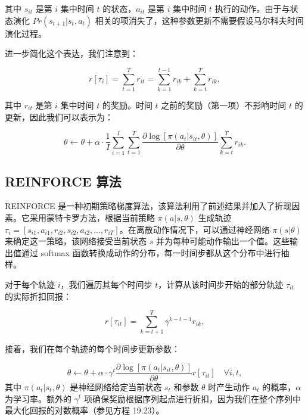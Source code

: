 其中 \(s_{it}\) 是第 \(i\) 集中时间 \(t\) 的状态，\(a_{it}\) 是第 \(i\) 集中时间 \(t\) 执行的动作。由于与状态演化 \(Pr(s_{t+1}|s_t, a_t)\) 相关的项消失了，这种参数更新不需要假设马尔科夫时间演化过程。

进一步简化这个表达，我们注意到：

\begin{equation}
r[\tau_i] = \sum_{t=1}^{T} r_{it} = \sum_{k=1}^{t-1} r_{ik} + \sum_{k=t}^{T} r_{ik}, 
\end{equation}

其中 \(r_{it}\) 是第 \(i\) 集中时间 \(t\) 的奖励。时间 \(t\) 之前的奖励（第一项）不影响时间 \(t\) 的更新，因此我们可以表示为：

\begin{equation}
\theta \leftarrow \theta + \alpha \cdot \frac{1}{I} \sum_{i=1}^{I} \sum_{t=1}^{T} \frac{\partial \log [\pi(a_t|s_{it}, \theta)]}{\partial \theta} \sum_{k=t}^{T} r_{ik}. 
\end{equation}

\subsection{REINFORCE 算法}
REINFORCE 是一种初期策略梯度算法，该算法利用了前述结果并加入了折现因素。它采用蒙特卡罗方法，根据当前策略 \(\pi(a|s, \theta)\) 生成轨迹 \(\tau_i = [s_{i1}, a_{i1}, r_{i2}, s_{i2}, a_{i2}, \ldots, r_{iT}]\)。在离散动作情况下，可以通过神经网络 \(\pi(s|\theta)\) 来确定这一策略，该网络接受当前状态 \(s\) 并为每种可能动作输出一个值。这些输出值通过 softmax 函数转换成动作的分布，每一时间步都从这个分布中进行抽样。

对于每个轨迹 \(i\)，我们遍历其每个时间步 \(t\)，计算从该时间步开始的部分轨迹 \(\tau_{it}\) 的实际折扣回报：

\begin{equation}
r[\tau_{it}] = \sum_{k=t+1}^{T} \gamma^{k-t-1} r_{ik}, 
\end{equation}

接着，我们在每个轨迹的每个时间步更新参数：

\begin{equation}
\theta \leftarrow \theta + \alpha \cdot \gamma^{t} \frac{\partial \log [\pi(a_t|s_{it}, \theta)]}{\partial \theta} r[\tau_{it}] \quad \forall i, t, 
\end{equation}
其中 \(\pi(a_t|s_t, \theta)\) 是神经网络给定当前状态 \(s_t\) 和参数 \(\theta\) 时产生动作 \(a_t\) 的概率，\(\alpha\) 为学习率。额外的 \(\gamma^{t}\) 项确保奖励根据序列起点进行折扣，因为我们在整个序列中最大化回报的对数概率（参见方程 19.23）。

